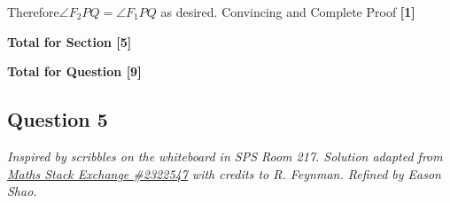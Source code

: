 \documentclass[12pt]{article}
\begin{document}
\begin{enumerate}
                     Therefore\(\angle F_2 PQ = \angle F_1 PQ\) as desired.
                    \hfill{Convincing and Complete Proof \textbf{[1]}}
                    
                    \hfill\textbf{Total for Section [5]}
            \end{enumerate}
            
            \hfill\textbf{Total for Question [9]}
        
        \subsection{Question 5}
            \textit{Inspired by scribbles on the whiteboard in SPS Room 217. Solution adapted from \href{https://math.stackexchange.com/questions/2322547/improper-integral-of-sinx-x-from-zero-to-infinity}{Maths Stack Exchange \#2322547} with credits to R. Feynman. Refined by Eason Shao.}
\end{document}
